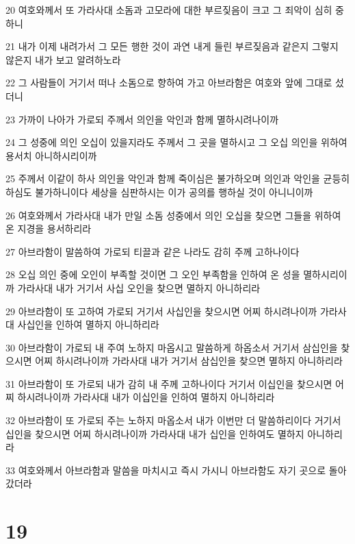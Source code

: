 \par 20 여호와께서 또 가라사대 소돔과 고모라에 대한 부르짖음이 크고 그 죄악이 심히 중하니
\par 21 내가 이제 내려가서 그 모든 행한 것이 과연 내게 들린 부르짖음과 같은지 그렇지 않은지 내가 보고 알려하노라
\par 22 그 사람들이 거기서 떠나 소돔으로 향하여 가고 아브라함은 여호와 앞에 그대로 섰더니
\par 23 가까이 나아가 가로되 주께서 의인을 악인과 함께 멸하시려나이까
\par 24 그 성중에 의인 오십이 있을지라도 주께서 그 곳을 멸하시고 그 오십 의인을 위하여 용서치 아니하시리이까
\par 25 주께서 이같이 하사 의인을 악인과 함께 죽이심은 불가하오며 의인과 악인을 균등히 하심도 불가하니이다 세상을 심판하시는 이가 공의를 행하실 것이 아니니이까
\par 26 여호와께서 가라사대 내가 만일 소돔 성중에서 의인 오십을 찾으면 그들을 위하여 온 지경을 용서하리라
\par 27 아브라함이 말씀하여 가로되 티끌과 같은 나라도 감히 주께 고하나이다
\par 28 오십 의인 중에 오인이 부족할 것이면 그 오인 부족함을 인하여 온 성을 멸하시리이까 가라사대 내가 거기서 사십 오인을 찾으면 멸하지 아니하리라
\par 29 아브라함이 또 고하여 가로되 거기서 사십인을 찾으시면 어찌 하시려나이까 가라사대 사십인을 인하여 멸하지 아니하리라
\par 30 아브라함이 가로되 내 주여 노하지 마옵시고 말씀하게 하옵소서 거기서 삼십인을 찾으시면 어찌 하시려나이까 가라사대 내가 거기서 삼십인을 찾으면 멸하지 아니하리라
\par 31 아브라함이 또 가로되 내가 감히 내 주께 고하나이다 거기서 이십인을 찾으시면 어찌 하시려나이까 가라사대 내가 이십인을 인하여 멸하지 아니하리라
\par 32 아브라함이 또 가로되 주는 노하지 마옵소서 내가 이번만 더 말씀하리이다 거기서 십인을 찾으시면 어찌 하시려나이까 가라사대 내가 십인을 인하여도 멸하지 아니하리라
\par 33 여호와께서 아브라함과 말씀을 마치시고 즉시 가시니 아브라함도 자기 곳으로 돌아갔더라

\chapter{19}

